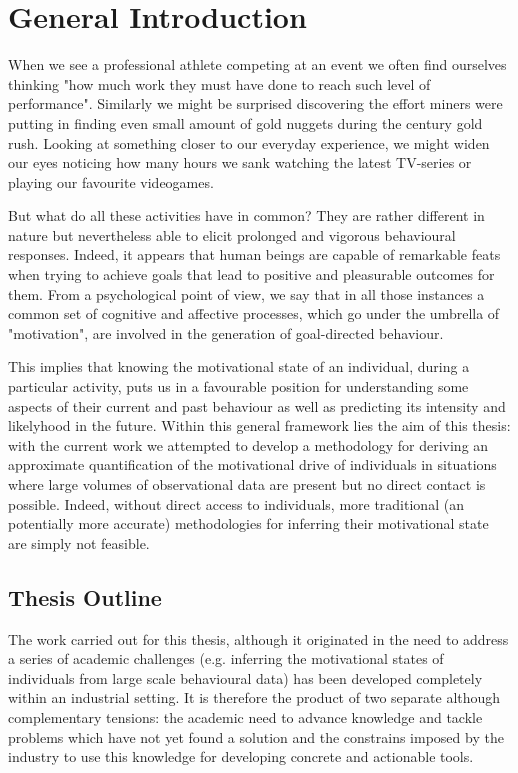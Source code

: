 \chapter*{General Introduction}
\label{chapter_general_intro}

When we see a professional athlete competing at an event we often find ourselves thinking "how much work they must have done to reach such level of performance". Similarly we might be surprised discovering the effort miners were putting in finding even small amount of gold nuggets during the  century gold rush. Looking at something closer to our everyday experience, we might widen our eyes noticing how many hours we sank watching the latest TV-series or playing our favourite videogames. 

But what do all these activities have in common? They are rather different in nature but nevertheless able to elicit prolonged and vigorous behavioural responses. Indeed, it appears that human beings are capable of remarkable feats when trying to achieve goals that lead to positive and pleasurable outcomes for them. From a psychological point of view, we say that in all those instances a common set of cognitive and affective processes, which go under the umbrella of "motivation", are involved in the generation of goal-directed behaviour. 

This implies that knowing the motivational state of an individual, during a particular activity, puts us in a favourable position for understanding some aspects of their current and past behaviour as well as  predicting its intensity and likelyhood in the future. Within this general framework lies the aim of this thesis: with the current work we attempted to develop a methodology for deriving an approximate quantification of the motivational drive of individuals in situations where large volumes of observational data are present but no direct contact is possible. Indeed, without direct access to individuals, more traditional (an potentially more accurate) methodologies for inferring their motivational state are simply not feasible.

\section*{Thesis Outline}
The work carried out for this thesis, although it originated in the need to address a series of academic challenges (e.g. inferring the motivational states of individuals from large scale behavioural data) has been developed completely within an industrial setting. It is therefore the product of two separate although complementary tensions: the academic need to advance knowledge and tackle problems which have not yet found a solution and the constrains imposed by the industry to use this knowledge for developing concrete and actionable tools.

